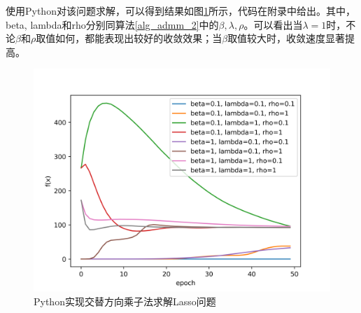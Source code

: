 \begin{solution}
    使用Python对该问题求解，可以得到结果如图\ref{figure_admm}所示，代码在附录中给出。其中，beta, lambda和rho分别同算法\ref{alg_admm_2}中的$\beta, \lambda, \rho$。可以看出当$\lambda=1$时，不论$\beta$和$\rho$取值如何，都能表现出较好的收敛效果；当$\beta$取值较大时，收敛速度显著提高。
    \begin{figure}[hbtp]
        \centering
        \includegraphics[width=150mm]{./Figures/admm.png}
        \caption{Python实现交替方向乘子法求解Lasso问题}
        \label{figure_admm}
    \end{figure}
\end{solution}